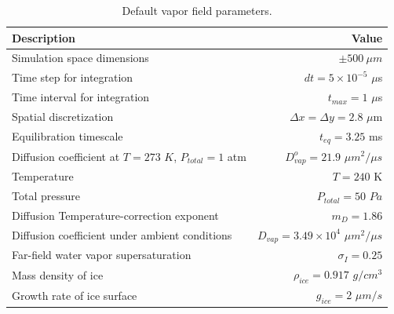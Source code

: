 \documentclass[draft]{agujournal2019}
\begin{document}
\begin{table}[H]
    \caption{Default vapor field parameters.}
    \begin{tabular}{lr}
    \hline 
    Description & Value\\
    \hline 
    Simulation space dimensions & $\pm 500 \ \mu m$ \\
    Time step for integration & $dt = 5\times 10^{-5}$ $\mu$s \\
    Time interval for integration & $t_{max} = 1$ $\mu$s\\
    Spatial discretization & $\Delta x=\Delta y=2.8$ $\mu$m \\
    Equilibration timescale & $t_{eq}=3.25$ ms \\
    Diffusion coefficient at $T = 273$ $K$, $P_{total} = 1$ atm & $D_{vap}^o = 21.9$ $\mu m^2/\mu s$ \\
    Temperature & $T = 240$ K \\
    Total pressure & $P_{total} = 50$ $Pa$\\
    Diffusion Temperature-correction exponent & $m_D  =1.86$ \\
    Diffusion coefficient under ambient conditions & $D_{vap} = 3.49\times 10^4$ $\mu m^2/\mu s$ \\
    Far-field water vapor supersaturation& $\sigma_I = 0.25$ \\
    Mass density of ice& $\rho_{ice} = 0.917$ $g/cm^3$ \\
    Growth rate of ice surface & $g_{ice} = 2$ $\mu m/s$ \\
    \hline
    \end{tabular}
    \label{table: vapor field parameters}
\end{table}

%


%
%
%
%
\end{document}
